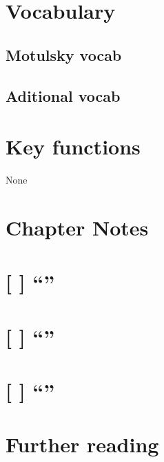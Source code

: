 \documentclass[]{book}
\theoremstyle{definition}
\theoremstyle{definition}
\theoremstyle{definition}
\theoremstyle{remark}
\begin{document}
\section*{Vocabulary}\label{vocabulary-5}

\subsection*{Motulsky vocab}\label{motulsky-vocab-5}

\subsection*{Aditional vocab}\label{aditional-vocab-3}

\section*{Key functions}\label{key-functions-4}

None

\section*{Chapter Notes}\label{chapter-notes-5}

\section{\texorpdfstring{{[} {]} ``''}{{[} {]} }}\label{section-6}

\section{\texorpdfstring{{[} {]} ``''}{{[} {]} }}\label{section-7}

\section{\texorpdfstring{{[} {]} ``''}{{[} {]} }}\label{section-8}

\section*{Further reading}\label{further-reading-4}
\end{document}
